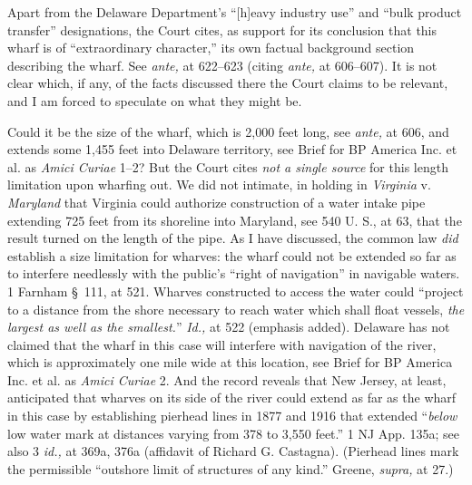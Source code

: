 {  Apart from the Delaware Department's ``[h]eavy industry use'' and
``bulk product transfer'' designations, the Court cites, as support
for its conclusion that this wharf is of ``extraordinary character,''
its own factual background section describing the wharf. See \emph{ante,}
at 622--623 (citing \emph{ante,} at 606--607). It is not clear which,
if any, of the facts discussed there the Court claims to be relevant,
and I am forced to speculate on what they might be.

  Could it be the size of the wharf, which is 2,000 feet long, see
\emph{ante,} at 606, and extends some 1,455 feet into Delaware territory,
see Brief for BP America Inc. et al. as \emph{Amici Curiae} 1--2?
But the Court cites \emph{not a single source} for this length limitation
upon wharfing out. We did not intimate, in holding in \emph{Virginia} v.
\emph{Maryland} that Virginia could authorize construction of a water
intake pipe extending 725 feet from its shoreline into Maryland, see
540 U. S., at 63, that the result turned on the length of the pipe.
As I have discussed, the common law \emph{did} establish a size limitation
for wharves: the wharf could not be extended so far as to interfere
need\newpage lessly with the public's ``right of navigation'' in
navigable waters. 1 Farnham \S~111, at 521. Wharves constructed to
access the water could ``project to a distance from the shore necessary
to reach water which shall float vessels, \emph{the largest as well as the
smallest.}'' \emph{Id.,} at 522 (emphasis added). Delaware has not
claimed that the wharf in this case will interfere with navigation
of the river, which is approximately one mile wide at this location,
see Brief for BP America Inc. et al. as \emph{Amici Curiae} 2. And the
record reveals that New Jersey, at least, anticipated that wharves on
its side of the river could extend as far as the wharf in this case by
establishing pierhead lines in 1877 and 1916 that extended ``\emph{below}
low water mark at distances varying from 378 to 3,550 feet.'' 1 NJ
App. 135a; see also 3 \emph{id.,} at 369a, 376a (affidavit of Richard G.
Castagna). (Pierhead lines mark the permissible ``outshore limit of
structures of any kind.'' Greene, \emph{supra,} at 27.)

}
